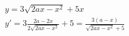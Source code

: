 \begin{ex}
\begin{align}
&y=3\sqrt{2ax-x^2}+5x\nonumber\\
&y'=3\frac{2a-2x}{2\sqrt{2ax-x^2}}+5=\frac{3(a-x)}{\sqrt{2ax-x^2}+5}\nonumber
\end{align}
\end{ex}